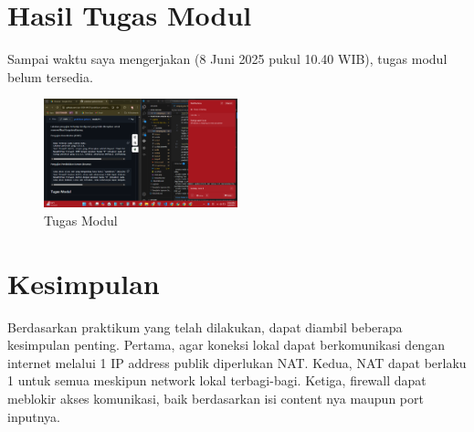 \section{Hasil Tugas Modul}
Sampai waktu saya mengerjakan (8 Juni 2025 pukul 10.40 WIB), tugas modul belum tersedia. 
\begin{figure}[h]
    \centering
    \includegraphics[width=0.5\textwidth]{tumod/notumod.png}
    \caption{Tugas Modul}
    \label{fig:tugas-modul}
\end{figure}

\section{Kesimpulan}
Berdasarkan praktikum yang telah dilakukan, dapat diambil beberapa kesimpulan penting. Pertama, agar koneksi lokal dapat berkomunikasi dengan internet melalui 1 IP address publik diperlukan NAT. Kedua, NAT dapat berlaku 1 untuk semua meskipun network lokal terbagi-bagi. Ketiga, firewall dapat meblokir akses komunikasi, baik berdasarkan isi content nya maupun port inputnya.

